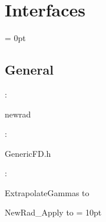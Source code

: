 
\section{Interfaces} 


\parskip = 0pt

\vspace{3mm} \subsection*{General}

: 

newrad
\vspace{2mm}

\vspace{5mm}

: 

GenericFD.h
\vspace{2mm}

: 



ExtrapolateGammas to 

NewRad\_Apply to 
\vspace{2mm}\parskip = 10pt 
